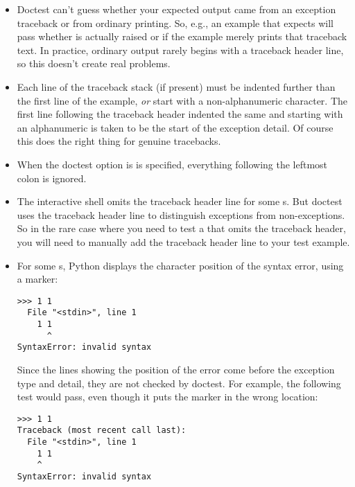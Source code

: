 \begin{itemize}

\item Doctest can't guess whether your expected output came from an
  exception traceback or from ordinary printing.  So, e.g., an example
  that expects  will pass whether
   is actually raised or if the example merely
  prints that traceback text.  In practice, ordinary output rarely begins
  with a traceback header line, so this doesn't create real problems.

\item Each line of the traceback stack (if present) must be indented
  further than the first line of the example, \emph{or} start with a
  non-alphanumeric character.  The first line following the traceback
  header indented the same and starting with an alphanumeric is taken
  to be the start of the exception detail.  Of course this does the
  right thing for genuine tracebacks.

\item When the  doctest option is
  is specified, everything following the leftmost colon is ignored.

\item The interactive shell omits the traceback header line for some
  s.  But doctest uses the traceback header
  line to distinguish exceptions from non-exceptions.  So in the rare
  case where you need to test a  that omits the
  traceback header, you will need to manually add the traceback header
  line to your test example.

\item For some s, Python displays the character
  position of the syntax error, using a \code{\^} marker:

\begin{verbatim}
>>> 1 1
  File "<stdin>", line 1
    1 1
      ^
SyntaxError: invalid syntax
\end{verbatim}

  Since the lines showing the position of the error come before the
  exception type and detail, they are not checked by doctest.  For
  example, the following test would pass, even though it puts the
  \code{\^} marker in the wrong location:

\begin{verbatim}
>>> 1 1
Traceback (most recent call last):
  File "<stdin>", line 1
    1 1
    ^
SyntaxError: invalid syntax
\end{verbatim}

\end{itemize}

